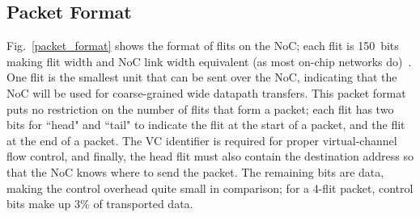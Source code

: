 %
%
%
%

\subsection{Packet Format}


%
%


Fig.~\ref{packet_format} shows the format of flits on the NoC; each flit is 150~bits making flit width and NoC link width equivalent (as most on-chip networks do)~\cite{dally_book}.
One flit is the smallest unit that can be sent over the NoC, indicating that the NoC will be used for coarse-grained wide datapath transfers.
This packet format puts no restriction on the number of flits that form a packet; each flit has two bits for ``head" and ``tail" to indicate the flit at the start of a packet, and the flit at the end of a packet.
The VC identifier is required for proper virtual-channel flow control, and finally, the head flit must also contain the destination address so that the NoC knows where to send the packet.
The remaining bits are data, making the control overhead quite small in comparison; for a 4-flit packet, control bits make up 3\% of transported data.


%
